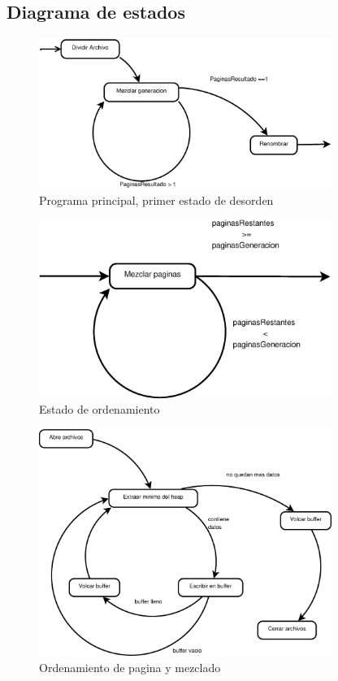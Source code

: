 \documentclass[11pt]{article}
\begin{document}
	
	\subsection{Diagrama de estados}

	  	\begin{figure}[H]
  			\centering
    		\includegraphics[width=0.85\textwidth]{Diagram3}
  			\caption{Programa principal, primer estado de desorden}
		\end{figure}
		\begin{figure}[H]
  			\centering
    		\includegraphics[width=0.85\textwidth]{Diagram2}
  			\caption{Estado de ordenamiento}
		\end{figure}
		\begin{figure}[H]
  			\centering
    		\includegraphics[width=0.85\textwidth]{Diagram1}
  			\caption{Ordenamiento de pagina y mezclado}
		\end{figure}
	
\end{document}
